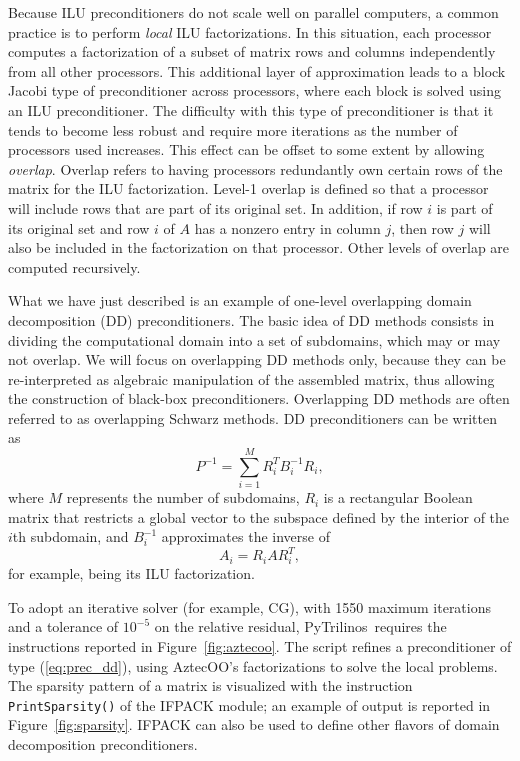 \documentclass[10pt,relax]{SANDreport}
\newcommand{\PyTrilinos}{{PyTrilinos}}
\begin{document}
Because ILU preconditioners do not scale well on parallel computers, a
common practice is to perform {\em local} ILU factorizations.  In this
situation, each processor computes a factorization of a subset of
matrix rows and columns independently from all other processors.  This
additional layer of approximation leads to a block Jacobi type of
preconditioner across processors, where each block is solved using an
ILU preconditioner.  The difficulty with this type of preconditioner
is that it tends to become less robust and require more iterations as
the number of processors used increases.  This effect can be offset to
some extent by allowing {\em overlap}.  Overlap refers to having
processors redundantly own certain rows of the matrix for the ILU
factorization.  Level-1 overlap is defined so that a processor will
include rows that are part of its original set.  In addition, if row
$i$ is part of its original set and row $i$ of $A$ has a nonzero entry
in column $j$, then row $j$ will also be included in the factorization
on that processor.  Other levels of overlap are computed recursively.

What we have just described is an example of one-level overlapping
domain decomposition (DD) preconditioners.  The basic idea of DD
methods consists in dividing the computational domain into a set of
subdomains, which may or may not overlap. We will focus on overlapping
DD methods only, because they can be re-interpreted as algebraic
manipulation of the assembled matrix, thus allowing the construction
of black-box preconditioners. Overlapping DD methods are often
referred to as overlapping Schwarz methods. DD preconditioners can be
written as
\begin{equation}
  \label{eq:prec_dd}
  P^{-1} = \sum_{i=1}^M R_i^T B_i^{-1} R_i,
\end{equation}
where $M$ represents the number of subdomains, $R_i$ is a rectangular
Boolean matrix that restricts a global vector to the subspace defined
by the interior of the $i$th subdomain, and $B_i^{-1}$ approximates the
inverse of
\begin{equation}
  \label{eq:aztecoo_tilde_a}
  A_i = R_i A R_i^T ,
\end{equation}
for example, being its ILU factorization.

\medskip

To adopt an iterative solver (for example, CG),
with 1550 maximum iterations and a tolerance of $10^{-5}$ on the
relative residual, \PyTrilinos\ requires the instructions reported in
Figure~\ref{fig:aztecoo}. The script refines a preconditioner of type
(\ref{eq:prec_dd}), using AztecOO's factorizations to solve the local
problems. The sparsity pattern of a matrix is visualized
with the instruction \verb!PrintSparsity()! of the IFPACK module;
an example of output is reported in
Figure~\ref{fig:sparsity}. IFPACK can
also be used to define other flavors of domain decomposition preconditioners.
\end{document}
